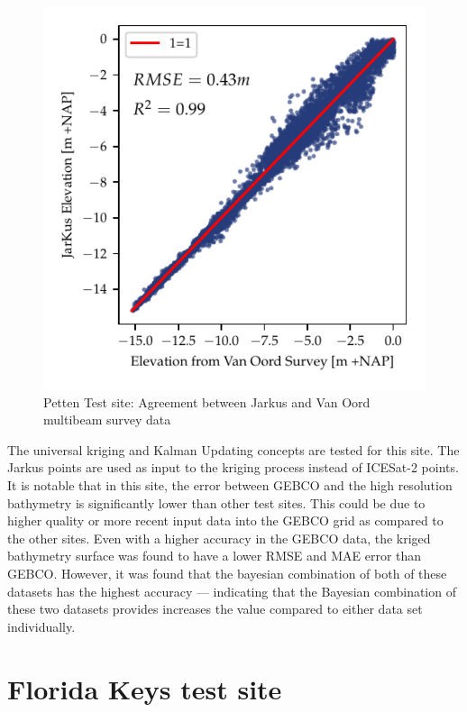 \begin{figure}[h]
    \centering
    \includegraphics{figures/petten_lidar_estimated_vs_truth.pdf}
    \caption{Petten Test site: Agreement between Jarkus and Van Oord multibeam survey data}
    \label{fig:petten-bias-plot}
\end{figure}

The universal kriging and Kalman Updating concepts are tested for this site. The Jarkus points are used as input to the kriging process instead of ICESat-2 points. It is notable that in this site, the error between GEBCO and the high resolution bathymetry is significantly lower than other test sites. This could be due to higher quality or more recent input data into the GEBCO grid as compared to the other sites. Even with a higher accuracy in the GEBCO data, the kriged bathymetry surface was found to have a lower RMSE and MAE error than GEBCO. However, it was found that the bayesian combination of both of these datasets has the highest accuracy --- indicating that the Bayesian combination of these two datasets provides increases the value compared to either data set individually. 




\section{Florida Keys test site}


